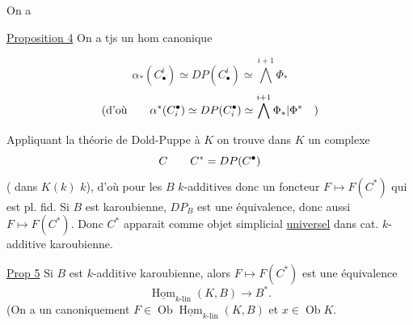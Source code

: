 On a

\uline{Proposition 4}  On a tjs un
hom canonique

\[
\alpha_*(C_\bullet^i)\simeq DP(C_\bullet^i)\simeq\bigwedge^{i+1}\Phi_*
\]
\[
(\text{d'où}\qquad \alpha^*(C_i^\bullet)\simeq DP(C_i^\bullet)\simeq\bigwedge^{i+1}{\Phi_*|\Phi^*}\quad)
\]

Appliquant la théorie de Dold-Puppe à $K$
 on trouve dans $K$ un complexe
\[
{C}\qquad C^*=DP(C^\bullet)
\]
(   dans  $K(k)$ 
 $k$), d'où pour les $B$ $k$-additives
donc un foncteur $F\longmapsto F(C^*)$ qui est pl. fid.
Si $B$ est karoubienne, $DP_B$ est une équivalence,
donc aussi $F\longmapsto F(C^*)$. Donc
$C^*$ apparait comme objet simplicial \uline{universel}
dans cat. $k$-additive karoubienne.

\uline{Prop 5} Si $B$ est $k$-additive karoubienne, alors
$F\longmapsto F(C^*)$ est une équivalence
\[
\underline{\operatorname{Hom}}_{k\text{-lin}}(K,B)\longrightarrow B^*.
\]
(On a un  canoniquement 
$F\in\operatorname{Ob}\underline{\operatorname{Hom}}_{k\text{-lin}}(K,B)$ et $x\in\operatorname{Ob}K$.


